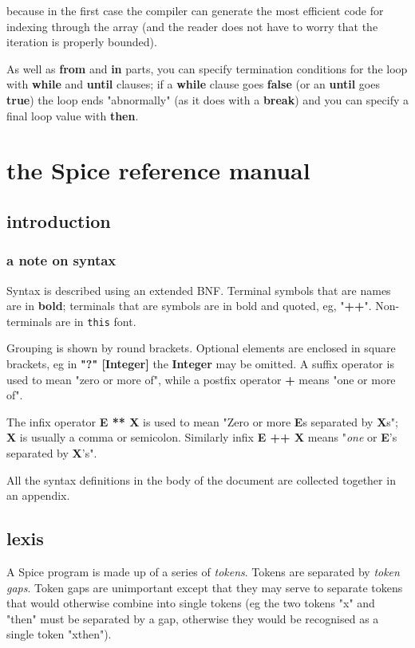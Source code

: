 \documentclass{report}
\begin{document}
because in the first case the compiler can generate the most efficient code
for indexing through the array (and the reader does not have to worry that
the iteration is properly bounded).

As well as {\bf from} and {\bf in} parts, you can specify termination conditions for
the loop with {\bf while} and {\bf until} clauses; if a {\bf while} clause goes {\bf false}
(or an {\bf until} goes {\bf true}) the loop ends "abnormally" (as it does with a
{\bf break}) and you can specify a final loop value with {\bf then}.



\part{the Spice reference manual}
\chapter{introduction}


\section{a note on syntax}


Syntax is described using an extended BNF. Terminal symbols that are names are
in {\bf bold}; terminals that are symbols are in bold and quoted, eg, "{\bf ++}".
Non-terminals are in {\tt this} font.

Grouping is shown by round brackets. Optional elements are enclosed in square
brackets, eg in {\bf "?" {[}Integer{]}} the {\bf Integer} may be omitted. A suffix
operator {\bf *} is used to mean "zero or more of", while a postfix operator {\bf +}
means "one or more of".

The infix operator {\bf E ** X} is used to mean "Zero or more {\bf E}s separated by
{\bf X}s"; {\bf X} is usually a comma or semicolon. Similarly infix {\bf E ++ X} means
"{\em one} or {\bf E}'s separated by {\bf X}'s".

All the syntax definitions in the body of the document are collected together
in an appendix.\chapter{lexis}


A Spice program is made up of a series of {\em tokens}. Tokens are
separated by {\em token gaps}. Token gaps are unimportant except that they
may serve to separate tokens that would otherwise combine into single
tokens (eg the two tokens "x" and "then" must be separated by a gap,
otherwise they would be recognised as a single token "xthen").
\end{document}
